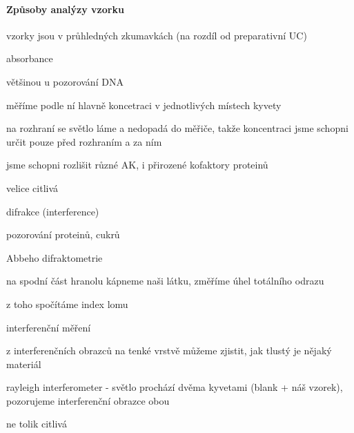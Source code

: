 \documentclass[DIV=8]{scrreprt}
\begin{document}
\paragraph{Způsoby analýzy vzorku}
\begin{myItemize}[nosep]
    \item vzorky jsou v průhledných zkumavkách (na rozdíl od preparativní UC)
    \item absorbance
\begin{myItemize}[nosep]
    \item většinou u pozorování DNA
    \item měříme podle ní hlavně koncetraci v jednotlivých místech kyvety
    \item na rozhraní se světlo láme a nedopadá do měřiče, takže koncentraci jsme schopni určit pouze před rozhraním a za ním
    \item jsme schopni rozlišit různé AK, i přirozené kofaktory proteinů
    \item velice citlivá
\end{myItemize}

    \item difrakce (interference)
\begin{myItemize}[nosep]
    \item pozorování proteinů, cukrů
    \item Abbeho difraktometrie
\begin{myItemize}[nosep]
    \item na spodní část hranolu kápneme naši látku, změříme úhel totálního odrazu
    \item z toho spočítáme index lomu
\end{myItemize}

    \item interferenční měření
\begin{myItemize}[nosep]
    \item z interferenčních obrazců na tenké vrstvě můžeme zjistit, jak tlustý je nějaký materiál
    \item rayleigh interferometer - světlo prochází dvěma kyvetami (blank + náš vzorek), pozorujeme interferenční obrazce obou
\end{myItemize}

    \item ne tolik citlivá
\end{myItemize}

\end{myItemize}
\end{document}
